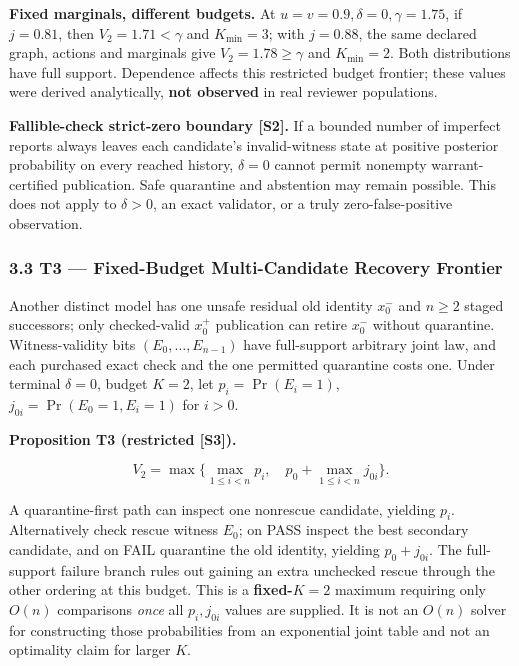 \documentclass[
  10pt,
  american,
  a4paper,
]{article}
\begin{document}
\textbf{Fixed marginals, different budgets.} At
\(u=v=0.9,\delta=0,\gamma=1.75\), if \(j=0.81\), then
\(V_2=1.71<\gamma\) and \(K_{\min}=3\); with \(j=0.88\), the same
declared graph, actions and marginals give \(V_2=1.78\ge\gamma\) and
\(K_{\min}=2\). Both distributions have full support. Dependence affects
this restricted budget frontier; these values were derived analytically,
\textbf{not observed} in real reviewer populations.

\textbf{Fallible-check strict-zero boundary {[}S2{]}.} If a bounded
number of imperfect reports always leaves each candidate's
invalid-witness state at positive posterior probability on every reached
history, \(\delta=0\) cannot permit nonempty warrant-certified
publication. Safe quarantine and abstention may remain possible. This
does not apply to \(\delta>0\), an exact validator, or a truly
zero-false-positive observation.


\hypertarget{t3-fixed-budget-multi-candidate-recovery-frontier}{%
\subsubsection{3.3 T3 --- Fixed-Budget Multi-Candidate Recovery
Frontier}\label{t3-fixed-budget-multi-candidate-recovery-frontier}}

Another distinct model has one unsafe residual old identity \(x_0^-\)
and \(n\ge2\) staged successors; only checked-valid \(x_0^+\)
publication can retire \(x_0^-\) without quarantine. Witness-validity
bits \((E_0,\ldots,E_{n-1})\) have full-support arbitrary joint law, and
each purchased exact check and the one permitted quarantine costs one.
Under terminal \(\delta=0\), budget \(K=2\), let \(p_i=\Pr(E_i=1)\),
\(j_{0i}=\Pr(E_0=1,E_i=1)\) for \(i>0\).

\textbf{Proposition T3 (restricted {[}S3{]}).}

\[
V_2=\max\Big\{\max_{1\le i<n}p_i,\quad
p_0+\max_{1\le i<n}j_{0i}\Big\}.
\]

A quarantine-first path can inspect one nonrescue candidate, yielding
\(p_i\). Alternatively check rescue witness \(E_0\); on PASS inspect the
best secondary candidate, and on FAIL quarantine the old identity,
yielding \(p_0+j_{0i}\). The full-support failure branch rules out
gaining an extra unchecked rescue through the other ordering at this
budget. This is a \textbf{fixed-\(K=2\)} maximum requiring only \(O(n)\)
comparisons \emph{once} all \(p_i,j_{0i}\) values are supplied. It is
not an \(O(n)\) solver for constructing those probabilities from an
exponential joint table and not an optimality claim for larger \(K\).
\end{document}
